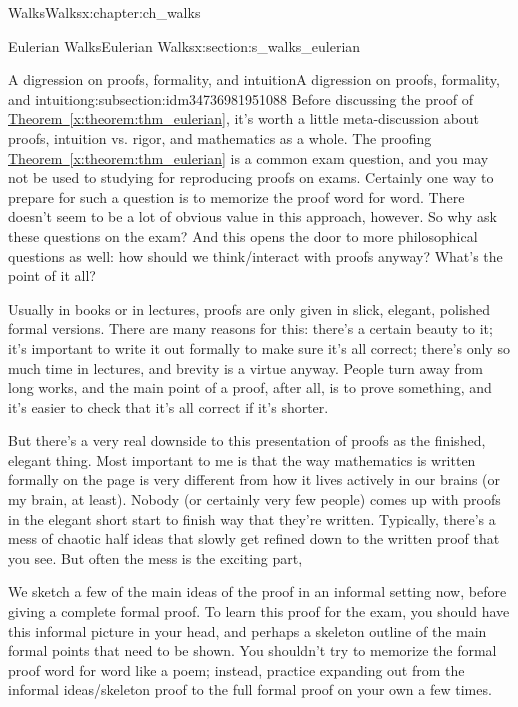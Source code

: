 \documentclass[oneside,10pt,]{book}
\newcommand{\xreffont}{\relax}
\numberwithin{equation}{section}
\begin{document}
\begin{chapterptx}{Walks}{}{Walks}{}{}{x:chapter:ch_walks}
\begin{sectionptx}{Eulerian Walks}{}{Eulerian Walks}{}{}{x:section:s_walks_eulerian}
%
\begin{subsectionptx}{A digression on proofs, formality, and intuition}{}{A digression on proofs, formality, and intuition}{}{}{g:subsection:idm34736981951088}
Before discussing the proof of \hyperref[x:theorem:thm_eulerian]{Theorem~{\xreffont\ref{x:theorem:thm_eulerian}}}, it's worth a little meta-discussion about proofs, intuition vs. rigor, and mathematics as a whole.  The proofing \hyperref[x:theorem:thm_eulerian]{Theorem~{\xreffont\ref{x:theorem:thm_eulerian}}} is a common exam question, and you may not be used to studying for reproducing proofs on exams.  Certainly one way to prepare for such a question is to memorize the proof word for word.  There doesn't seem to be a lot of obvious value in this approach, however.  So why ask these questions on the exam? And this opens the door to more philosophical questions as well: how should we think\slash{}interact with proofs anyway?  What's the point of it all?%
\par
Usually in books or in lectures, proofs are only given in slick, elegant, polished formal versions.  There are many reasons for this: there's a certain beauty to it; it's important to write it out formally to make sure it's all correct; there's only so much time in lectures, and brevity is a virtue anyway.  People turn away from long works, and the main point of a proof, after all, is to prove something, and it's easier to check that it's all correct if it's shorter.%
\par
But there's a very real downside to this presentation of proofs as the finished, elegant thing.  Most important to me is that the way mathematics is written formally on the page is very different from how it lives actively in our brains (or my brain, at least).  Nobody (or certainly very few people) comes up with proofs in the elegant short start to finish way that they're written.  Typically, there's a mess of chaotic half ideas that slowly get refined down to the written proof that you see.  But often the mess is the exciting part,%
\par
We sketch a few of the main ideas of the proof in an informal setting now, before giving a complete formal proof.  To learn this proof for the exam, you should have this informal picture in your head, and perhaps a skeleton outline of the main formal points that need to be shown.  You shouldn't try to memorize the formal proof word for word like a poem; instead, practice expanding out from the informal ideas\slash{}skeleton proof to the full formal proof on your own a few times.%

\end{subsectionptx}
\end{sectionptx}
\end{chapterptx}
\end{document}
